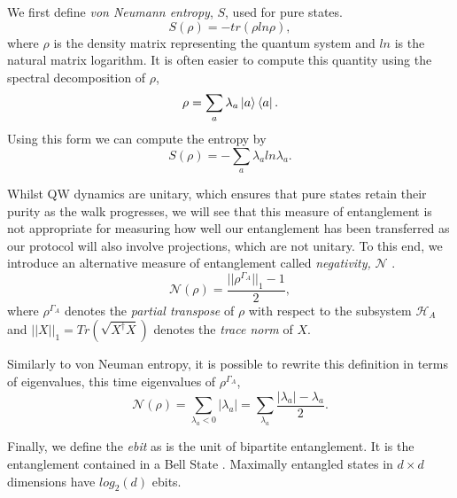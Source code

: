 We first define \emph{von Neumann entropy}, $S$, used for pure states.
\begin{equation}
    S(\rho) = -tr(\rho ln \rho),
\end{equation}
where $\rho$ is the density matrix representing the quantum system and $ln$ is the natural matrix logarithm. 
It is often easier to compute this quantity using the spectral decomposition of $\rho$,
\begin{equation}
    \rho = \sum_a \lambda_a \ket{a}\bra{a}.
\end{equation}
Using this form we can compute the entropy by
\begin{equation}
    S(\rho) = -\sum_a \lambda_a ln\lambda_a.
\end{equation}

Whilst QW dynamics are unitary, which ensures that pure states retain their purity as the walk progresses, we will see that this measure of entanglement is not appropriate for measuring how well our entanglement has been transferred as our protocol will also involve projections, which are not unitary.
To this end, we introduce an alternative measure of entanglement called \emph{negativity,} $\mathcal{N}$ \cite{Vidal_2002}.
\begin{equation}
    \mathcal{N}(\rho) = \frac{||\rho^{\Gamma_A}||_1-1}{2},
\end{equation}
where $\rho^{\Gamma_A}$ denotes the \emph{partial transpose} of $\rho$ with respect to the subsystem $\mathcal{H}_A$ and $||X||_1 = Tr(\sqrt{X^\dagger X})$ denotes the \emph{trace norm} of $X$.\newline

Similarly to von Neuman entropy, it is possible to rewrite this definition in terms of eigenvalues, this time eigenvalues of $\rho^{\Gamma_A}$,
\begin{equation}
    \mathcal{N}(\rho) = \sum_{\lambda_a < 0}|\lambda_a| = \sum_{\lambda_a} \frac{|\lambda_a| - \lambda_a}{2}.
\end{equation}

Finally, we define the \emph{ebit} as is the unit of bipartite entanglement. It is the entanglement contained in a Bell State \cite{Eisert_2000}. Maximally entangled states in $d \times d$ dimensions have $log_2(d)$ ebits.